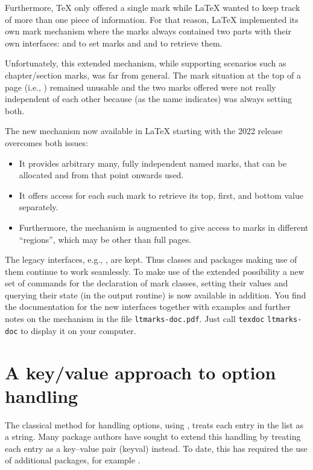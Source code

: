 \documentclass{ltnews}
\begin{document}
Furthermore, \TeX{} only offered a single mark while \LaTeX{} wanted to
keep track of more than one piece of information.  For that reason,
\LaTeX{} implemented its own mark mechanism where the marks always
contained two parts with their own interfaces:  and
 to set marks and  and  to
retrieve them.

Unfortunately, this extended mechanism, while supporting scenarios such
as chapter/section marks, was far from general. The mark
situation at the top of a page (i.e., ) remained
unusable and the two marks offered were not really independent of
each other because  (as the name indicates) was
always setting both.


The new mechanism now available in \LaTeX{} starting with the 2022
release overcomes both issues:
\begin{itemize}
\item
  It provides arbitrary many, fully independent named marks, that
  can be allocated and from that point onwards used.
\item
  It offers access for each such mark to retrieve its top,
  first, and bottom value separately.
\item
  Furthermore, the mechanism is augmented to give access to marks
  in different ``regions'', which may be other than full pages.
\end{itemize}
The legacy interfaces, e.g., , are kept. Thus classes and
packages making use of them continue to work seamlessly. To make use
of the extended possibility a new set of commands for the declaration of
mark classes, setting their values and querying their state (in the
output routine) is now available in addition.
%
You find the documentation for the new interfaces together with
examples and further notes on the mechanism in the file
\texttt{ltmarks-doc.pdf}. Just call \texttt{texdoc}
\texttt{ltmarks-doc} to display it on your computer.


\section{A key/value approach to option handling}

The classical \LaTeXe{} method for handling options, using ,
treats each entry in the list as a string. Many package authors have sought to
extend this handling by treating each entry as a key--value pair (keyval)
instead. To date, this has required the use of additional packages, for example
.
\end{document}
